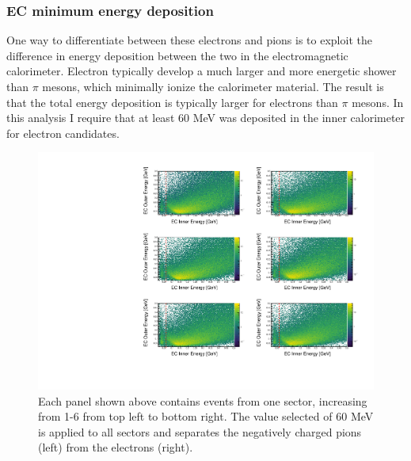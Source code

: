 
\subsubsection{EC minimum energy deposition}
One way to differentiate between these electrons and pions is to exploit the difference in energy deposition between the two in the electromagnetic calorimeter.  Electron typically develop a much larger and more energetic shower than $\pi$ mesons, which minimally ionize the calorimeter material.  The result is that the total energy deposition is typically larger for electrons than $\pi$ mesons.  In this analysis I require that at least 60 MeV was deposited in the inner calorimeter for electron candidates.  

\begin{figure}
	\centering
	\label{fig:ec-edep}
	\includegraphics[width=\textwidth]{image/plots/electron-id/summary-ec-edep.pdf}
	\caption{Each panel shown above contains events from one sector, increasing from 1-6 from top left to bottom right.  The value selected of 60 MeV is applied to all sectors and separates the negatively charged pions (left) from the electrons (right).}
\end{figure}

